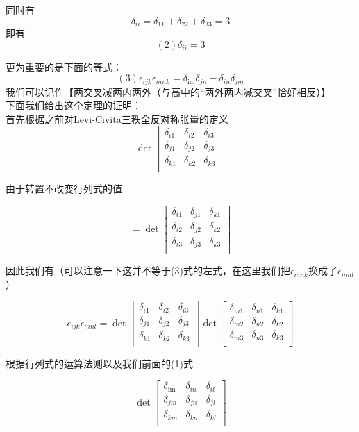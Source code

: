 \documentclass{article}
\begin{document}
\begin{CJK}{UTF8}{gkai}
同时有\[\delta_{ii}=\delta_{11}+\delta_{22}+\delta_{33}=3\]
即有\[(2)\delta_{ii}=3\]

更为重要的是下面的等式：\\
\[(3)\epsilon_{ijk}\epsilon_{mnk}=\delta_{\text{im}}\delta_{jn}-\delta_{in}\delta_{jm}\]
我们可以记作【两交叉减两内两外（与高中的“两外两内减交叉”恰好相反）】\\

下面我们给出这个定理的证明：\\
首先根据之前对Levi-Civita三秩全反对称张量的定义\\
\[\det\begin{bmatrix}
    \delta_{i1}&\delta_{i2}&\delta_{i3}\\    
    \delta_{j1}&\delta_{j2}&\delta_{j3}\\
    \delta_{k1}&\delta_{k2}&\delta_{k3}\\
    \end{bmatrix}\]

由于转置不改变行列式的值

\[=\det
\begin{bmatrix}
    \delta_{i1}&\delta_{j1}&\delta_{k1}\\    
    \delta_{i2}&\delta_{j2}&\delta_{k2}\\
    \delta_{i3}&\delta_{j3}&\delta_{k3}\\
\end{bmatrix}\]

因此我们有（可以注意一下这并不等于(3)式的左式，在这里我们把$\epsilon_{mnk}$换成了$\epsilon_{mnl}$）

\[\epsilon_{ijk}\epsilon_{mnl}=
\det\begin{bmatrix}
    \delta_{i1}&\delta_{i2}&\delta_{i3}\\    
    \delta_{j1}&\delta_{j2}&\delta_{j3}\\
    \delta_{k1}&\delta_{k2}&\delta_{k3}\\
\end{bmatrix}
\det\begin{bmatrix}
    \delta_{m1}&\delta_{n1}&\delta_{k1}\\    
    \delta_{m2}&\delta_{n2}&\delta_{k2}\\
    \delta_{m3}&\delta_{n3}&\delta_{k3}\\
\end{bmatrix}\]

根据行列式的运算法则以及我们前面的(1)式

\[\det
\begin{bmatrix}
    \delta_{\text{im}}&\delta_{in}&\delta_{il}\\    
    \delta_{jm}&\delta_{jn}&\delta_{jl}\\
    \delta_{km}&\delta_{kn}&\delta_{kl}\\
\end{bmatrix}
\]


\end{CJK}
\end{document}

